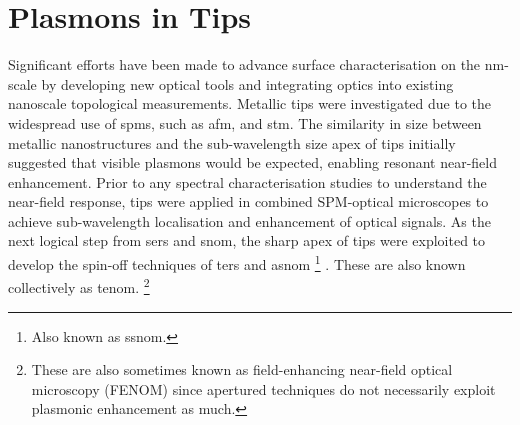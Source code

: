 \documentclass{article}
\begin{document}

\section{Plasmons in Tips}
\label{sec:tip_literature}

Significant efforts have been made to advance surface characterisation on the nm-scale by developing new optical tools and integrating optics into existing nanoscale topological measurements. Metallic tips were  investigated due to the widespread use of \glspl{spm}, such as \gls{afm}, and \gls{stm}. The similarity in size between metallic nanostructures and the sub-wavelength size apex of tips initially suggested that visible plasmons would be expected, enabling resonant near-field enhancement. Prior to any spectral characterisation studies to understand the near-field response, tips were applied in combined SPM-optical microscopes to achieve sub-wavelength localisation and enhancement of optical signals. As the next logical step from \gls{sers} and \gls{snom}, the sharp apex of tips were exploited to develop the spin-off techniques of \gls{ters} \cite{stockle2000, anderson2000, hayazawa2000, pettinger2000} and \gls{asnom}%
\footnote{Also known as \gls{ssnom}.}
\cite{zenhausern1994, zenhausern1995, bachelot1995, knoll1997, knoll1998, keilmann1999}.
These are also known collectively as \gls{tenom}.%
\footnote{These are also sometimes known as field-enhancing near-field optical microscopy (FENOM) since apertured techniques do not necessarily exploit plasmonic enhancement as much.}
\end{document}
